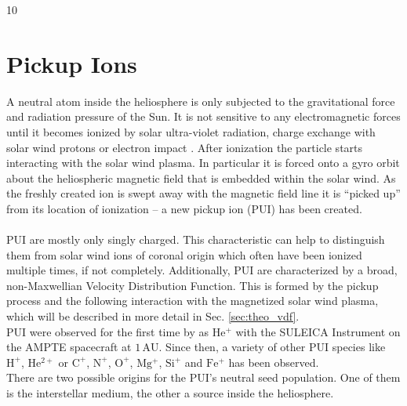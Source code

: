10%

\chapter{Pickup Ions} %

\label{chapter:theory} %





A neutral atom inside the heliosphere is only subjected to the gravitational force and radiation pressure of the Sun. It is not sensitive to any electromagnetic forces until it becomes ionized by solar ultra-violet radiation, charge exchange with solar wind protons or electron impact \citep{rucinsky}. After ionization the particle starts interacting with the solar wind plasma. In particular it is forced onto a gyro orbit about the heliospheric magnetic field that is embedded within the solar wind. As the freshly created ion is swept away with the magnetic field line it is ``picked up'' from its location of ionization -- a new pickup ion (PUI) has been created.
\\ \\
PUI are mostly only singly charged. This characteristic can help to distinguish them from solar wind ions of coronal origin which often have been ionized multiple times, if not completely. Additionally, PUI are characterized by a broad, non-Maxwellian Velocity Distribution Function. This is formed by the pickup process and the following interaction with the magnetized solar wind plasma, which will be described in more detail in Sec. \ref{sec:theo_vdf}.\\
PUI were observed for the first time by \citet{moebius_nature_85} as $\mathrm{He^{+}}$ with the SULEICA Instrument on the AMPTE spacecraft at $1\,\mathrm{AU}$. Since then, a variety of other PUI species like $\mathrm{H^{+}}$, $\mathrm{He^{2+}}$ or $\mathrm{C^{+}}$, $\mathrm{N^{+}}$, $\mathrm{O^{+}}$, $\mathrm{Mg^{+}}$, $\mathrm{Si^{+}}$ and $\mathrm{Fe^{+}}$ has been observed.\\
There are two possible origins for the PUI's neutral seed population. One of them is the interstellar medium, the other a source inside the heliosphere.
